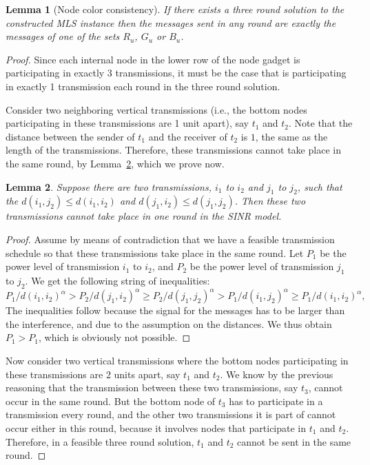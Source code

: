 \documentclass{article}
\newtheorem{lemma}{Lemma}
\begin{document}
\begin{lemma}[Node color consistency]
If there exists a three round solution to the constructed MLS instance then the messages sent in any round are exactly the messages of one of the sets $R_u$, $G_u$ or $B_u$.
\end{lemma}
\begin{proof}
Since each internal node in the lower row of the node gadget is participating in exactly 3 transmissions, it must be the case that is participating in exactly 1 transmission each round in the three round solution.

Consider two neighboring vertical transmissions (i.e., the bottom nodes participating in these transmissions are 1 unit apart), say $t_1$ and $t_2$. Note that the distance between the sender of $t_1$ and the receiver of $t_2$ is $1$, the same as the length of the transmissions. Therefore, these transmissions cannot take place in the same round, by Lemma~\ref{crossinglemma}, which we prove now.

\begin{lemma}\label{crossinglemma}
Suppose there are two transmissions, $i_1$ to $i_2$ and $j_1$ to $j_2$, such that the $d( i_1, j_2 ) \leq d( i_1, i_2 )$ and $d( j_1, i_2 ) \leq d( j_1, j_2 )$.  Then these two transmissions cannot take place in one round in the SINR model.
\end{lemma}
\begin{proof}
Assume by means of contradiction that we have a feasible transmission schedule so that these transmissions take place in the same round.
Let $P_1$ be the power level of transmission $i_1$ to $i_2$, and $P_2$ be the power level of transmission $j_1$ to $j_2$. We get the following string of inequalities:
\[
	P_1 / d( i_1, i_2 )^\alpha  >  P_2 / d( j_1, i_2 )^\alpha \geq P_2 / d( j_1, j_2 )^\alpha  > P_1 / d( i_1, j_2 )^\alpha  \geq P_1 / d( i_1, i_2 )^\alpha,
\]
The inequalities follow because the signal for the messages has to be larger than the interference, and due to the assumption on the distances. We thus obtain $P_1 > P_1$, which is obviously not possible.
\end{proof}



Now consider two vertical transmissions where the bottom nodes participating in these transmissions are 2 units apart, say $t_1$ and $t_2$. We know by the previous reasoning that the transmission between these two transmissions, say $t_3$, cannot occur in the same round. But the bottom node of $t_3$ has to participate in a transmission every round, and the other two transmissions it is part of cannot occur either in this round, because it involves nodes that participate in $t_1$ and $t_2$. Therefore, in a feasible three round solution, $t_1$ and $t_2$ cannot be sent in the same round.


\end{proof}
\end{document}
